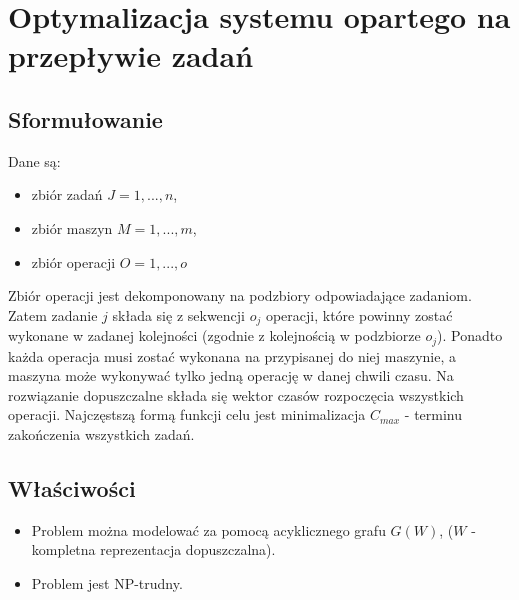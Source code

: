 \section{Optymalizacja systemu opartego na przepływie zadań}
	\subsection{Sformułowanie}
		Dane są:
		\begin{itemize}
			\item zbiór zadań $J={1, ..., n}$,
			\item zbiór maszyn $M={1, ..., m}$,
			\item zbiór operacji $O={1, ..., o}$
		\end{itemize}				
		Zbiór operacji jest dekomponowany na podzbiory odpowiadające zadaniom. Zatem zadanie $j$ składa się 
		z sekwencji $o_j$ operacji, które powinny zostać wykonane w zadanej kolejności (zgodnie z kolejnością w podzbiorze 
		$o_j$). Ponadto każda operacja musi zostać wykonana na przypisanej do niej maszynie, a maszyna może wykonywać
		tylko jedną operację w danej chwili czasu. \newline
		Na rozwiązanie dopuszczalne składa się wektor czasów rozpoczęcia wszystkich operacji. Najczęstszą formą funkcji celu
		jest minimalizacja $C_{max}$ - terminu zakończenia wszystkich zadań.
		
	\subsection{Właściwości}
		\begin{itemize}
			\item Problem można modelować za pomocą acyklicznego grafu $G(W)$, ($W$ - kompletna reprezentacja dopuszczalna).
			\item Problem jest NP-trudny.
		\end{itemize}			
	
